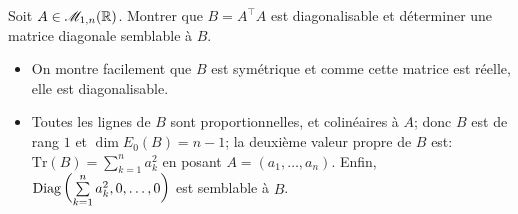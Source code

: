 \begin{exercice}
    Soit $A \in \mathscr{M}_{1,n} (\mathbb{R})$. Montrer que $B = A^\top A$ est diagonalisable et déterminer une matrice diagonale semblable à $B$.
\end{exercice}

\begin{solution}
    \begin{itemize}
        \item On montre facilement que $B$ est symétrique et comme cette matrice est réelle, elle est diagonalisable.
        \item Toutes les lignes de $B$ sont proportionnelles, et colinéaires à $A$; donc $B$ est de rang $1$ et $\dim E_0(B) = n-1$; la deuxième valeur propre de $B$ est: $\mathrm{Tr}(B) = \sum\limits_{k = 1}^{n} a_k^2$ en posant $A = (a_1, \dots, a_n)$. Enfin, $\mathrm{Diag} \left(\sum\limits_{k = 1}^{n} a_k^2, 0, \dots, 0 \right)$ est semblable à $B$.
    \end{itemize}
\end{solution}
